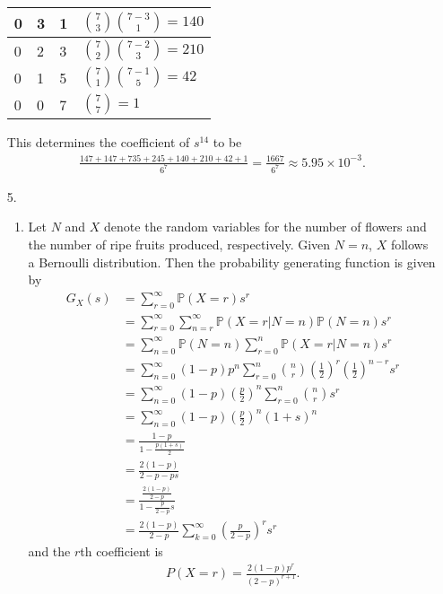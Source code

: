 \documentclass[a4paper,12pt]{article}
\begin{document}
\begin{enumerate}
\begin{center}
\begin{tabular}{| l | l | l | l |}
                0 & 3 & 1 & $\binom{7}{3} \binom{7 - 3}{1} = 140$ \\ \hline
                0 & 2 & 3 & $\binom{7}{2} \binom{7 - 2}{3} = 210$ \\ \hline
                0 & 1 & 5 & $\binom{7}{1} \binom{7 - 1}{5} = 42$ \\ \hline
                0 & 0 & 7 & $\binom{7}{7} = 1$ \\
                \hline
            \end{tabular}
        \end{center}
        This determines the coefficient of $s^14$ to be
        \begin{align*}
            \frac{147 +147 + 735 + 245 + 140 + 210 + 42 +1}{6^7} = \frac{1667}{6^7} \approx 5.95 \times 10^{-3}.
        \end{align*}

    \item[5.] 
        \begin{enumerate}
            \item
                Let $N$ and $X$ denote the random variables for the number of flowers and the number of ripe fruits produced, respectively. Given $N = n$, $X$ follows a Bernoulli distribution. Then the probability generating function is given by
                \begin{align*}
                    G_X(s) &= \sum_{r = 0}^{\infty} \mathbb{P}(X = r) s^r \\
                    &= \sum_{r = 0}^{\infty} \sum_{n = r}^{\infty} \mathbb{P}(X = r | N = n) \mathbb{P}(N = n) s^r \\
                    &= \sum_{n = 0}^{\infty} \mathbb{P}(N = n) \sum_{r = 0}^{n} \mathbb{P}(X = r | N = n) s^r \\
                    &= \sum_{n = 0}^{\infty} (1 - p)p^n \sum_{r = 0}^{n} \binom{n}{r} \left( \frac{1}{2} \right)^r \left( \frac{1}{2} \right)^{n - r} s^r \\
                    &= \sum_{n = 0}^{\infty} (1 - p) \left( \frac{p}{2} \right)^n \sum_{r = 0}^{n} \binom{n}{r} s^r \\
                    &= \sum_{n = 0}^{\infty} (1 - p) \left( \frac{p}{2} \right)^n (1 + s)^n \\
                    &= \frac{1 - p}{1 - \frac{p(1 + s)}{2}} \\
                    &= \frac{2(1 - p)}{2 - p - ps} \\
                    &= \frac{\frac{2(1 - p)}{2 - p}}{1 - \frac{p}{2 - p}s} \\
                    &= \frac{2(1 - p)}{2 - p} \sum_{k = 0}^{\infty} \left( \frac{p}{2 - p} \right)^r s^r
                \end{align*}
                and the $r$th coefficient is
                \begin{align*}
                    P(X = r) = \frac{2(1 - p)p^r}{(2 - p)^{r + 1}}.
                \end{align*}


\end{enumerate}
\end{enumerate}
\end{document}
